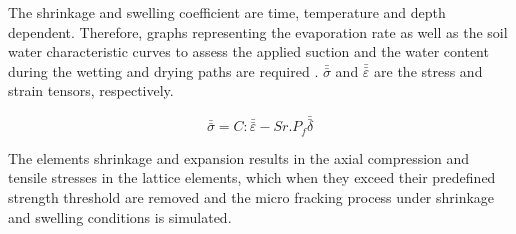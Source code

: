 The shrinkage and swelling coefficient are time, temperature and depth dependent. Therefore, graphs representing the evaporation rate as well as the soil water characteristic curves to assess the applied suction and the water content during the wetting and drying paths are required \cite{Voetal2017}. $\bar{\bar{\sigma}}$ and $\bar{\bar{\varepsilon}}$ are the stress and strain tensors, respectively. 

\begin{equation}
\label{eq:LEM_Shrinkage_3}
\bar{\bar{\sigma}}=C:\bar{\bar{\varepsilon}}-Sr.P_f\bar{\bar{\delta}}
\end{equation}

The elements shrinkage and expansion results in the axial compression and tensile stresses in the lattice elements, which when they exceed their predefined strength threshold are removed and the micro fracking process under shrinkage and swelling conditions is simulated.
